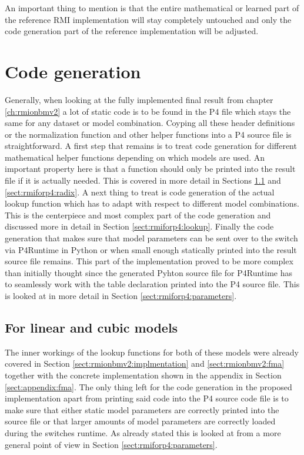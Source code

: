 An important thing to mention is that the entire mathematical or learned part of the reference RMI implementation will stay completely untouched and only the code generation part of the reference implementation will be adjusted.

\section{Code generation}
Generally, when looking at the fully implemented final result from chapter \ref{ch:rmionbmv2} a lot of static code is to be found in the P4 file which stays the same for any dataset or model combination. Coyping all these header definitions or the normalization function and other helper functions into a P4 source file is straightforward. A first step that remains is to treat code generation for different mathematical helper functions depending on which models are used. An important property here is that a function should only be printed into the result file if it is actually needed. This is covered in more detail in Sections \ref{sect:rmiforp4:linear_cubic} and \ref{sect:rmiforp4:radix}. A next thing to treat is code generation of the actual lookup function which has to adapt with respect to different model combinations. This is the centerpiece and most complex part of the code generation and discussed more in detail in Section \ref{sect:rmiforp4:lookup}. Finally the code generation that makes sure that model parameters can be sent over to the switch via P4Runtime in Python or when small enough statically printed into the result source file remains. This part of the implementation proved to be more complex than initially thought since the generated Pyhton source file for P4Runtime has to seamlessly work with the table declaration printed into the P4 source file. This is looked at in more detail in Section \ref{sect:rmiforp4:parameters}.

\subsection{For linear and cubic models}
\label{sect:rmiforp4:linear_cubic}
The inner workings of the lookup functions for both of these models were already covered in Section \ref{sect:rmionbmv2:implmentation} and \ref{sect:rmionbmv2:fma} together with the concrete implementation shown in the appendix in Section \ref{sect:appendix:fma}. The only thing left for the code generation in the proposed implementation apart from printing said code into the P4 source code file is to make sure that either static model parameters are correctly printed into the source file or that larger amounts of model parameters are correctly loaded during the switches runtime. As already stated this is looked at from a more general point of view in Section \ref{sect:rmiforp4:parameters}.

